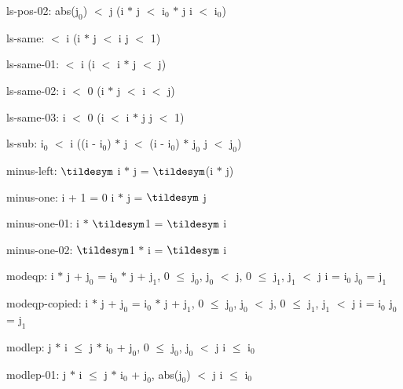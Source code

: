 \documentclass[a4paper]{article}
\begin{document}
\item	ls-pos-02:  \Fol abs($\mbox{j}_{0}$) $<$ j \Imp (i $*$ j $<$ $\mbox{i}_{0}$ $*$ j \Equiv i $<$ $\mbox{i}_{0}$)

\item	ls-same:   $<$ i \Imp (i $*$ j $<$ i \Equiv j $<$ 1)

\item	ls-same-01:   $<$ i \Imp (i $<$ i $*$ j  $<$ j)

\item	ls-same-02:  \Fol i $<$ 0 \Imp (i $*$ j $<$ i  $<$ j)

\item	ls-same-03:  \Fol i $<$ 0 \Imp (i $<$ i $*$ j \Equiv j $<$ 1)

\item	ls-sub:  \Fol $\mbox{i}_{0}$ $<$ i \Imp ((i - $\mbox{i}_{0}$) $*$ j $<$ (i - $\mbox{i}_{0}$) $*$ $\mbox{j}_{0}$ \Equiv j $<$ $\mbox{j}_{0}$)

\item	minus-left:  \Fol $\tildesym$ i $*$ j = $\tildesym$(i $*$ j)

\item	minus-one:  \Fol i + 1 = 0 \Imp i $*$ j = $\tildesym$ j

\item	minus-one-01:  \Fol i $*$ $\tildesym$1 = $\tildesym$ i

\item	minus-one-02:  \Fol $\tildesym$1 $*$ i = $\tildesym$ i

\item	modeqp: i $*$ j + $\mbox{j}_{0}$ = $\mbox{i}_{0}$ $*$ j + $\mbox{j}_{1}$, 0 $\le$ $\mbox{j}_{0}$, $\mbox{j}_{0}$ $<$ j, 0 $\le$ $\mbox{j}_{1}$, $\mbox{j}_{1}$ $<$ j \Fol i = $\mbox{i}_{0}$ \And $\mbox{j}_{0}$ = $\mbox{j}_{1}$

\item	modeqp-copied: i $*$ j + $\mbox{j}_{0}$ = $\mbox{i}_{0}$ $*$ j + $\mbox{j}_{1}$, 0 $\le$ $\mbox{j}_{0}$, $\mbox{j}_{0}$ $<$ j, 0 $\le$ $\mbox{j}_{1}$, $\mbox{j}_{1}$ $<$ j \Fol i = $\mbox{i}_{0}$ \And $\mbox{j}_{0}$ = $\mbox{j}_{1}$

\item	modlep: j $*$ i $\le$ j $*$ $\mbox{i}_{0}$ + $\mbox{j}_{0}$, 0 $\le$ $\mbox{j}_{0}$, $\mbox{j}_{0}$ $<$ j \Fol i $\le$ $\mbox{i}_{0}$

\item	modlep-01: j $*$ i $\le$ j $*$ $\mbox{i}_{0}$ + $\mbox{j}_{0}$, abs($\mbox{j}_{0}$) $<$ j \Fol i $\le$ $\mbox{i}_{0}$
\end{document}
